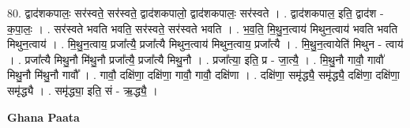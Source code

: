 \documentclass[17pt]{extarticle}
\begin{document}
80. द्वाद॑शकपालः॒ सर॑स्वते॒ सर॑स्वते॒ द्वाद॑शकपालो॒ द्वाद॑शकपालः॒ सर॑स्वते । . द्वाद॑शकपाल॒ इति॒ द्वाद॑श - क॒पा॒लः॒ । . सर॑स्वते भवति भवति॒ सर॑स्वते॒ सर॑स्वते भवति । . भ॒व॒ति॒ मि॒थु॒न॒त्वाय॑ मिथुन॒त्वाय॑ भवति भवति मिथुन॒त्वाय॑ । . मि॒थु॒न॒त्वाय॒ प्रजा᳚त्यै॒ प्रजा᳚त्यै मिथुन॒त्वाय॑ मिथुन॒त्वाय॒ प्रजा᳚त्यै । . मि॒थु॒न॒त्वायेति॑ मिथुन - त्वाय॑ । . प्रजा᳚त्यै मिथु॒नौ मि॑थु॒नौ प्रजा᳚त्यै॒ प्रजा᳚त्यै मिथु॒नौ । . प्रजा᳚त्या॒ इति॒ प्र - जा॒त्यै॒ । . मि॒थु॒नौ गावौ॒ गावौ॑ मिथु॒नौ मि॑थु॒नौ गावौ᳚ । . गावौ॒ दक्षि॑णा॒ दक्षि॑णा॒ गावौ॒ गावौ॒ दक्षि॑णा । . दक्षि॑णा॒ समृ॑द्ध्यै॒ समृ॑द्ध्यै॒ दक्षि॑णा॒ दक्षि॑णा॒ समृ॑द्ध्यै । . समृ॑द्ध्या॒ इति॒ सं - ऋ॒द्ध्यै॒ । \newline

\textbf{Ghana Paata } \newline
\end{document}
